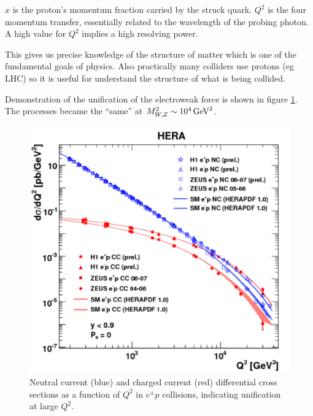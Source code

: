 $x$ is the proton's momentum fraction carried by the struck quark.
$Q^2$ is the four momentum transfer, essentially related to the wavelength of the probing photon.  A high value for $Q^2$ implies a high resolving power.

This gives us precise knowledge of the structure of matter which is one of the fundamental goals of physics.  Also practically many colliders use protons (eg LHC) so it is useful for understand the structure of what is being collided.

Demonstration of the unification of the electroweak force is shown in figure \ref{fig:ch3_electroweakUnification}.  The processes became the ``same'' at $M^2_{W,Z} \sim 10^4 \mathrm{\,GeV}^2$.

\begin{figure}[!htb]
  \begin{center}
    \includegraphics[width=\textwidth]{images/chapter_3/electroweakUnification.pdf}
    \caption[Electroweak unification measurements at HERA]{Neutral current (blue) and charged current (red) differential cross sections as a function of $Q^2$ in $e^\pm p$ collisions, indicating unification at large $Q^2$. \cite{SUSYUnification}}
    \label{fig:ch3_electroweakUnification}
  \end{center}
\end{figure}

\clearpage

